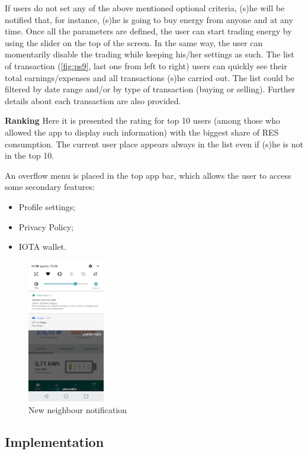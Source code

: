If users do not set any of the above mentioned optional criteria, (s)he will be notified that, for instance, (s)he is going to buy energy from anyone and at any time. Once all the parameters are defined, the user can start trading energy by using the slider on the top of the screen. In the same way, the user can momentarily disable the trading while keeping his/her settings as such.
The list of transaction (\cref{fig:ps9}, last one from left to right) users can quickly see their total earnings/expenses and all transactions (s)he carried out.  The list could be filtered by date range and/or by type of transaction (buying or selling). Further details about each transaction are also provided.  



\textbf{Ranking}
Here it is presented the rating for top 10 users (among those who allowed the app to display such information) with the biggest share of RES consumption. The current user place appears always in the list even if (s)he is not in the top 10.

An overflow menu is placed in the top app bar, which allows the user to access some secondary features:
\begin{itemize}
    \item Profile settings;
    \item Privacy Policy;
    \item IOTA wallet.
\end{itemize}


\begin{figure}[h]
\centering
\includegraphics[width=0.3\textwidth]{./Images/ps10}
\caption{New neighbour notification}
\label{fig:ps10}
\end{figure}

\subsection{Implementation}

